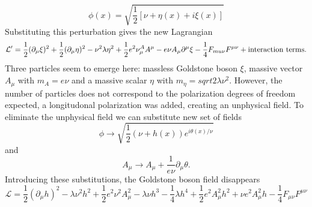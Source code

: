\begin{equation}
\phi(x) =\sqrt{\frac{1}{2}[\nu+\eta(x)+i\xi(x)]}
\end{equation}
Substituting this perturbation gives the new Lagrangian
\begin{equation}
\mathcal{L}'=\frac{1}{2}(\partial_\mu\xi)^2+\frac{1}{2}(\partial_\mu\eta)^2-\nu^2\lambda\eta^2+\frac{1}{2}e^2\nu^A_\mu A^\mu-e\nu A_\mu \partial^\mu\xi-\frac{1}{4}F_{mu\nu}F^{\mu\nu} + \textnormal{interaction terms}.
\end{equation}
Three particles seem to emerge here: massless Goldstone boson $\xi$, massive vector $A_\mu$ with $m_A=e\nu$ and a massive scalar $\eta$ with $m_\eta=sqrt{2\lambda\nu^2}$. However, the number of particles does not correspond to the polarization degrees of freedom expected, a longitudonal polarization was added, creating an unphysical field. To eliminate the unphysical field we can substitute new set of fields 
\begin{equation}
\phi \rightarrow \sqrt{\frac{1}{2}(\nu+h(x))e^{i\theta(x)/\nu}}
\end{equation}
and 
\begin{equation}
A_\mu \rightarrow A_\mu + \frac{1}{e\nu} \partial_\mu\theta.
\end{equation}
Introducing these substitutions, the Goldstone boson field disappears
\begin{equation}
\mathcal{L} = \frac{1}{2}(\partial_\mu h)^2 -\lambda\nu^2h^2+\frac{1}{2}e^2\nu^2A_\mu^2-\lambda\nu h^3-\frac{1}{4}\lambda h^4+\frac{1}{2}e^2A_\mu^2h^2+\nu e^2A_\mu^2h-\frac{1}{4}F_{\mu\nu}F^{\mu\nu}
\end{equation}
